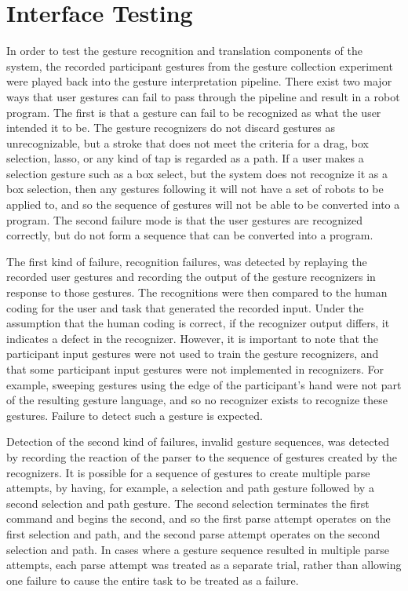 \section{Interface Testing}

In order to test the gesture recognition and translation components of the system, the recorded participant gestures from the gesture collection experiment were played back into the gesture interpretation pipeline. 
There exist two major ways that user gestures can fail to pass through the pipeline and result in a robot program. 
The first is that a gesture can fail to be recognized as what the user intended it to be. 
The gesture recognizers do not discard gestures as unrecognizable, but a stroke that does not meet the criteria for a drag, box selection, lasso, or any kind of tap is regarded as a path. 
If a user makes a selection gesture such as a box select, but the system does not recognize it as a box selection, then any gestures following it will not have a set of robots to be applied to, and so the sequence of gestures will not be able to be converted into a program. 
The second failure mode is that the user gestures are recognized correctly, but do not form a sequence that can be converted into a program. 

The first kind of failure, recognition failures, was detected by replaying the recorded user gestures and recording the output of the gesture recognizers in response to those gestures. 
The recognitions were then compared to the human coding for the user and task that generated the recorded input. 
Under the assumption that the human coding is correct, if the recognizer output differs, it indicates a defect in the recognizer. 
However, it is important to note that the participant input gestures were not used to train the gesture recognizers, and that some participant input gestures were not implemented in recognizers. 
For example, sweeping gestures using the edge of the participant's hand were not part of the resulting gesture language, and so no recognizer exists to recognize these gestures. 
Failure to detect such a gesture is expected. 

Detection of the second kind of failures, invalid gesture sequences, was detected by recording the reaction of the parser to the sequence of gestures created by the recognizers. 
It is possible for a sequence of gestures to create multiple parse attempts, by having, for example, a selection and path gesture followed by a second selection and path gesture.
The second selection terminates the first command and begins the second, and so the first parse attempt operates on the first selection and path, and the second parse attempt operates on the second selection and path. 
In cases where a gesture sequence resulted in multiple parse attempts, each parse attempt was treated as a separate trial, rather than allowing one failure to cause the entire task to be treated as a failure.  

